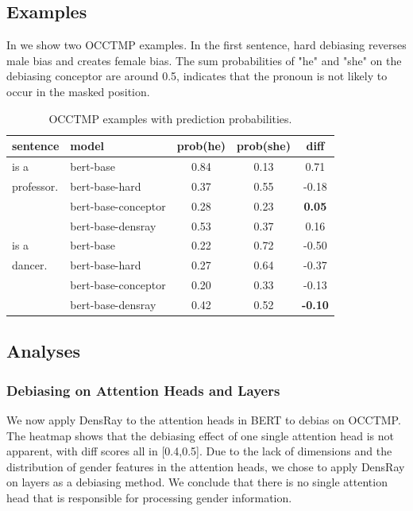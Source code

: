 \subsection{Examples}
In  we show two OCCTMP examples. In the first sentence, hard debiasing reverses male bias and creates female bias. The sum probabilities of "he" and "she" on the debiasing conceptor are around 0.5, indicates that the pronoun is not likely to occur in the masked position.
\begin{table}[h]
	\centering
	\footnotesize
	\begin{tabular}{llccc}
		\hline
		sentence & model & prob(he) & prob(she) &diff\\
		\hline
		[MASK] is a & bert-base & 0.84 & 0.13&0.71\\
		professor.& bert-base-hard& 0.37 & 0.55&-0.18\\
		& bert-base-conceptor& 0.28 & 0.23&\textbf{0.05}\\
		& bert-base-densray & 0.53 & 0.37&0.16\\
		\hline
		[MASK] is a & bert-base & 0.22 & 0.72&-0.50\\
		dancer.  & bert-base-hard& 0.27 & 0.64&-0.37\\
		& bert-base-conceptor& 0.20 & 0.33&-0.13\\
		& bert-base-densray& 0.42 & 0.52&\textbf{-0.10}\\
		\hline
	\end{tabular}
	\caption{
		OCCTMP examples with prediction probabilities.}
\end{table}


\subsection{Analyses}

\subsubsection{Debiasing on Attention Heads and Layers}
We now apply DensRay to the attention heads in BERT to debias on OCCTMP. The heatmap  shows that the debiasing effect of one single attention head is not apparent, with diff scores all in [0.4,0.5]. Due to the lack of dimensions and the distribution of gender features in the attention heads, we chose to apply DensRay on layers as a debiasing method. We conclude that there is no single attention head that is responsible for processing gender information.

